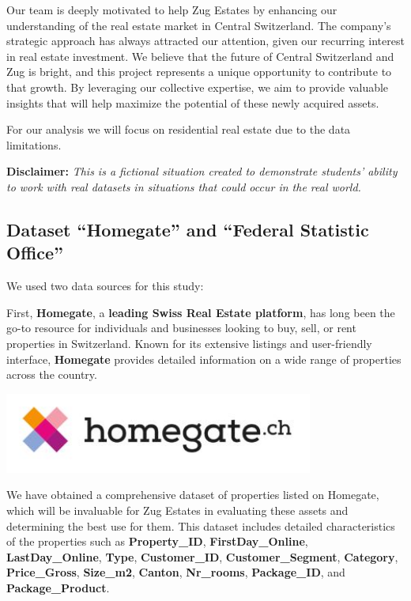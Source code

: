 \documentclass[
]{article}
\begin{document}
Our team is deeply motivated to help Zug Estates by enhancing our
understanding of the real estate market in Central Switzerland. The
company's strategic approach has always attracted our attention, given
our recurring interest in real estate investment. We believe that the
future of Central Switzerland and Zug is bright, and this project
represents a unique opportunity to contribute to that growth. By
leveraging our collective expertise, we aim to provide valuable insights
that will help maximize the potential of these newly acquired assets.

For our analysis we will focus on residential real estate due to the
data limitations.

\textbf{Disclaimer:} \emph{This is a fictional situation created to
demonstrate students' ability to work with real datasets in situations
that could occur in the real world.}

\subsection{Dataset ``Homegate'' and ``Federal Statistic
Office''}\label{dataset-homegate-and-federal-statistic-office}

We used two data sources for this study:

First, \textbf{Homegate}, a \textbf{leading Swiss Real Estate platform},
has long been the go-to resource for individuals and businesses looking
to buy, sell, or rent properties in Switzerland. Known for its extensive
listings and user-friendly interface, \textbf{Homegate} provides
detailed information on a wide range of properties across the country.

\includegraphics[width=4in,height=\textheight]{images/homegate.JPG}

We have obtained a comprehensive dataset of properties listed on
Homegate, which will be invaluable for Zug Estates in evaluating these
assets and determining the best use for them. This dataset includes
detailed characteristics of the properties such as
\textbf{Property\_ID}, \textbf{FirstDay\_Online},
\textbf{LastDay\_Online}, \textbf{Type}, \textbf{Customer\_ID},
\textbf{Customer\_Segment}, \textbf{Category}, \textbf{Price\_Gross},
\textbf{Size\_m2}, \textbf{Canton}, \textbf{Nr\_rooms},
\textbf{Package\_ID}, and \textbf{Package\_Product}.
\end{document}
